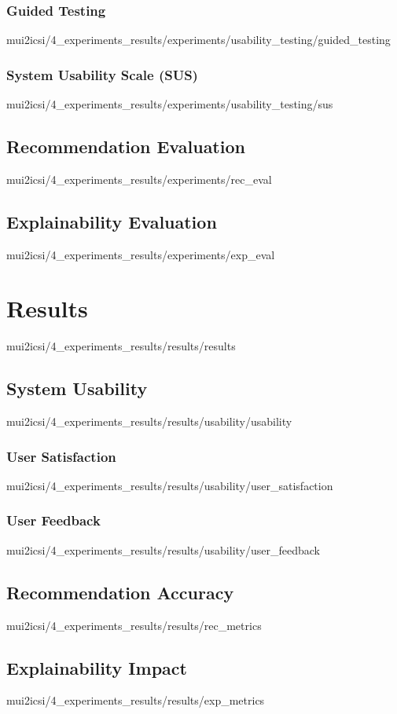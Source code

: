 \documentclass[english,epsbased,copyright,final,printable,covers,extendedindex,firstnumbered,tfm,gnuplot,loc,loe,lof,lot]{tfgtfmthesisuam}
\begin{document}
        \subsubsection{Guided Testing\label{SSS:GUIDEDTEST}}{mui2icsi/4_experiments_results/experiments/usability_testing/guided_testing}
        \subsubsection{System Usability Scale (SUS)\label{SSS:SUS}}{mui2icsi/4_experiments_results/experiments/usability_testing/sus}
      \subsection{Recommendation Evaluation\label{SS:RECEVAL}}{mui2icsi/4_experiments_results/experiments/rec_eval}
      \subsection{Explainability Evaluation\label{SS:EXPLAINEVAL}}{mui2icsi/4_experiments_results/experiments/exp_eval}

    \section{Results\label{SEC:RESULTS}}{mui2icsi/4_experiments_results/results/results}
      \subsection{System Usability\label{SS:USABILITY}}{mui2icsi/4_experiments_results/results/usability/usability}
        \subsubsection{User Satisfaction\label{SSS:USERSAT}}{mui2icsi/4_experiments_results/results/usability/user_satisfaction}
        \subsubsection{User Feedback\label{SSS:USERFEEDBACK}}{mui2icsi/4_experiments_results/results/usability/user_feedback}
      \subsection{Recommendation Accuracy\label{SS:RECACC}}{mui2icsi/4_experiments_results/results/rec_metrics}
      \subsection{Explainability Impact\label{SS:EXPLAIN}}{mui2icsi/4_experiments_results/results/exp_metrics}
\end{document}
